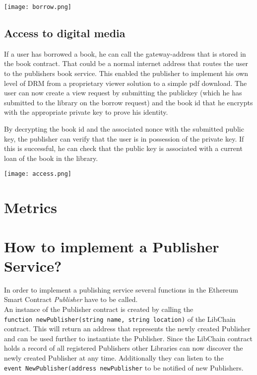 \vspace{0.3cm}
\begin{center}
\texttt{[image: borrow.png]}
\end{center}

\subsection{Access to digital media \label{sssec:access}}
If a user has borrowed a book, he can call the gateway-address that is stored in the book contract. That could be a normal internet address that routes the user to the publishers book service. This enabled the publisher to implement his own level of DRM from a proprietary viewer solution to a simple pdf download.
The user can now create a view request by submitting the publickey (which he has submitted to the library on the borrow request) and the book id that he encrypts with the appropriate private key to prove his identity.

By decrypting the book id and the associated nonce with the submitted public key, the publisher can verify that the user is in possession of the private key. If this is successful, he can check that the public key is associated with a current loan of the book in the library.


\vspace{0.3cm}
\begin{center}
\texttt{[image: access.png]}
\end{center}

\section{Metrics}

\section{How to implement a Publisher Service?}
In order to implement a publishing service several functions in the Ethereum Smart Contract \textit{Publisher} have to be called. \\
An instance of the Publisher contract is created by calling the \\
 \verb|function newPublisher(string name, string location)| of the LibChain contract. This will return an address that represents the newly created Publisher and can be used further to instantiate the Publisher. Since the LibChain contract holds a record of all registered Publishers other Libraries can now discover the newly created Publisher at any time. Additionally they can listen to the \\
 \verb|event NewPublisher(address newPublisher| to be notified of new Publishers.
